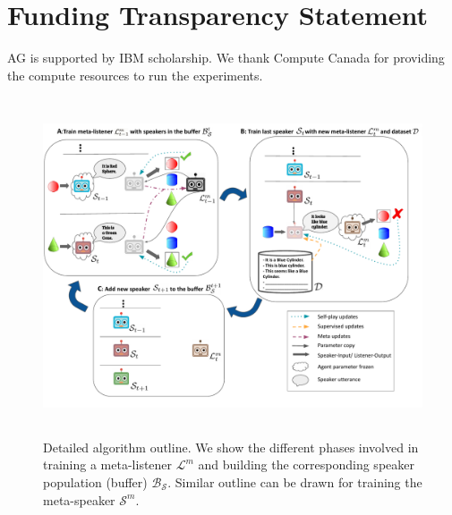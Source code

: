\documentclass{article}
\begin{document}
\section*{Funding Transparency Statement}
AG is supported by IBM scholarship. We thank Compute Canada for providing the compute resources to run the experiments.






\clearpage
\appendix

\begin{figure}[h]
    \centering
    \includegraphics[width=\linewidth, height=10cm]{figs/adaptive-main-pic.pdf}
    \caption{Detailed algorithm outline. We show the different phases involved in training a meta-listener $\mathcal{L}^m$ and building the corresponding speaker population (buffer) $\mathcal{B}_{\mathcal{S}}$. Similar outline can be drawn for training the meta-speaker $\mathcal{S}^m$.}
\end{figure}
\end{document}
